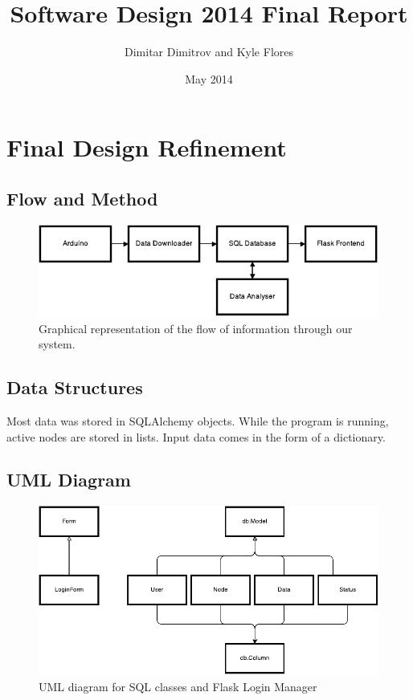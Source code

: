 \documentclass{article}
\title{Software Design 2014 Final Report}
\author{Dimitar Dimitrov and Kyle Flores}
\date{May 2014}
\begin{document}
\maketitle

\section*{Final Design Refinement}
\subsection*{Flow and Method}
\begin{figure}[ht!]
\centering
\includegraphics{flowpicture}
\caption{Graphical representation of the flow of information through our system.}
\end{figure}

\subsection*{Data Structures}
\par Most data was stored in SQLAlchemy objects.  While the program is running, active nodes are stored in lists.  Input data comes in the form of a dictionary.

\subsection*{UML Diagram}

\begin{figure}[ht!]
\centering
\includegraphics{UML}
\caption{UML diagram for SQL classes and Flask Login Manager}
\end{figure}
\end{document}
